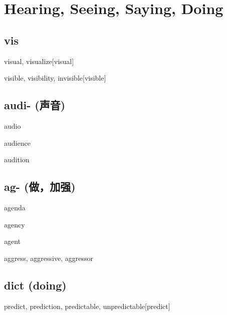 \chapter{Hearing, Seeing, Saying, Doing}

\section{vis}
\begin{wordRef}{visual, visualize}[visual]
\end{wordRef}

\begin{wordRef}{visible, visibility, invisible}[visible]
\end{wordRef}

\section{audi- (声音)}
\begin{wordRef}{audio}
\end{wordRef}

\begin{wordRef}{audience}
\end{wordRef}

\begin{wordRef}{audition}
\end{wordRef}

\section{{ag- (做，加强)}}

\begin{wordRef}{agenda}
\end{wordRef}

\begin{wordRef}{agency}
\end{wordRef}

\begin{wordRef}{agent}
\end{wordRef}

\begin{wordRef}{aggress, aggressive, aggressor}
\end{wordRef}

\section{dict (doing)}

\begin{wordRef}{predict, prediction, predictable, unpredictable}[predict]
\end{wordRef}

